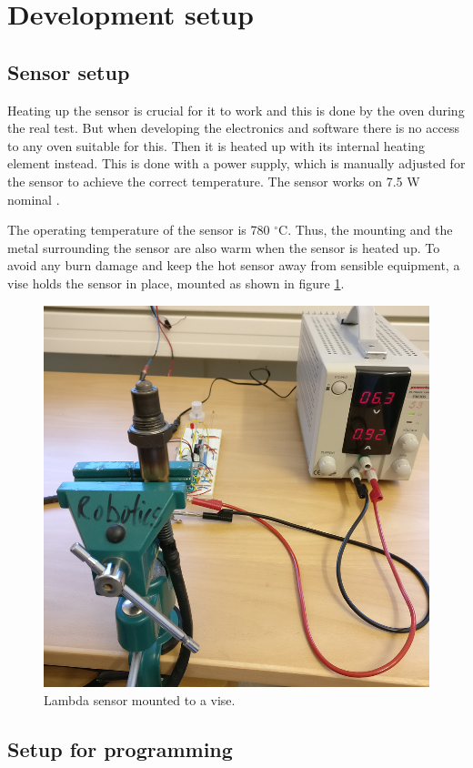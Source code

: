 \section{Development setup}

\subsection{Sensor setup}

Heating up the sensor is crucial for it to work and this is done by the oven during the real test. But when developing the electronics and software there is no access to any oven suitable for this. Then it is heated up with its internal heating element instead. This is done with a power supply, which is manually adjusted for the sensor to achieve the correct temperature. The sensor works on 7.5 W nominal \cite{LSU49}.

The operating temperature of the sensor is 780 $^\circ$C. Thus, the mounting and the metal surrounding the sensor are also warm when the sensor is heated up. To avoid any burn damage and keep the hot sensor away from sensible equipment, a vise holds the sensor in place, mounted as shown in figure \ref{fig:lambda_bench}.


\begin{figure}
    \centering
    \includegraphics[width=.8\textwidth]{Chapter3/Figures/lambda_bench.png}
    \caption{Lambda sensor mounted to a vise.}
    \label{fig:lambda_bench}
\end{figure}


\subsection{Setup for programming}

